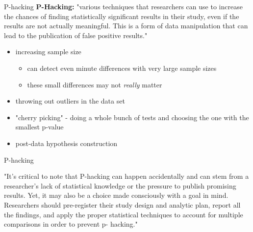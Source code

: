\documentclass{beamer}
\begin{document}
\begin{frame}{P-hacking}
\textbf{P-Hacking:} "various techniques that researchers can use to increase the chances of finding statistically significant results in their study, even if the results are not actually meaningful. This is a form of data manipulation that can lead to the publication of false positive results."\footnotemark \vspace{6mm}

\begin{itemize}
    \item increasing sample size
    \begin{itemize}
        \item can detect even minute differences with very large sample sizes
        \item these small differences may not \textit{really} matter
    \end{itemize}
    \item throwing out outliers in the data set
    \item "cherry picking" - doing a whole bunch of tests and choosing the one with the smallest p-value
    \item post-data hypothesis construction
\end{itemize}
\end{frame}

\begin{frame}{P-hacking}
\begin{center}
"It’s critical to note that P-hacking can happen accidentally and can stem from a researcher’s lack of statistical knowledge or the pressure to publish promising results. Yet, it may also be a choice made consciously with a goal in mind. Researchers should pre-register their study design and analytic plan, report all the findings, and apply the proper statistical techniques to account for multiple comparisons in order to prevent p- hacking." \footnotemark
\end{center}

\end{frame}
\end{document}
